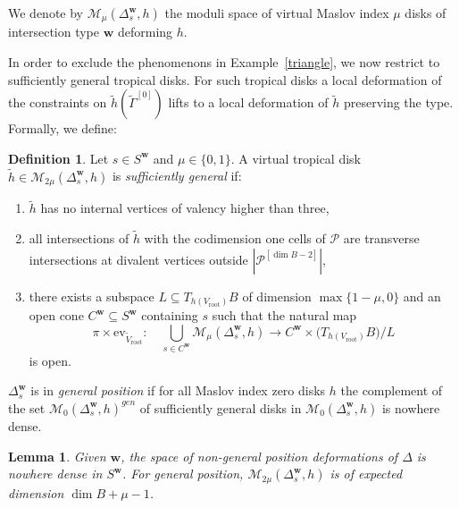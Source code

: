 \documentclass[11pt,letter]{amsart}
\newtheorem{lemma}[theorem]{Lemma}
\theoremstyle{definition}
\newtheorem{definition}[theorem]{Definition}
\theoremstyle{remark}
\numberwithin{equation}{section}
\numberwithin{figure}{section}
\newcommand{\Cover}{\Delta^{\mathbf w}_{s} }
\newcommand{\defbase}{S^{\mathbf w}}
\newcommand{\defcone}{C^{\mathbf w}}
\newcommand {\lra}  {\longrightarrow}
\newcommand {\M} {\mathcal{M}}
\renewcommand {\max} {{\operatorname{max}}}
\renewcommand{\P}  {\mathscr{P}}
\newcommand {\rootvertex}  {V_{\mathrm{root}}}
\begin{document}
We denote by $\M_{\mu}(\Cover,h)$ the moduli space of virtual Maslov index $\mu$
disks of intersection type $\mathbf w$ deforming $h$.

In order to exclude the phenomenons in Example~\ref{triangle}, we now restrict
to sufficiently general tropical disks. For such tropical disks a local
deformation of the constraints on $\tilde h(\tilde \Gamma^{[0]})$ lifts to a
local deformation of $\tilde h$ preserving the type. Formally, we define:

\begin{definition}
Let $ s\in \defbase$ and $\mu \in\{0,1\}$. A virtual tropical disk $\tilde h \in
\M_{2\mu}(\Cover,h)$ is \emph{sufficiently general} if:
\begin{enumerate}
\item
$\tilde h$ has no internal vertices of valency higher than three,
\item
all intersections of $\tilde h$ with the codimension one cells of $\P$ are
transverse intersections at divalent vertices outside $|\P^{[\dim B-2]}|$,
\item 
there exists a subspace $L\subseteq T_{h(\rootvertex)}B$ of dimension
$\max\{1-\mu,0\}$ and an open cone $\defcone \subseteq \defbase$ containing $s$
such that the natural map 
\begin{equation}
\label{eq:constraintmap}
\pi \times \mathrm{ev}_{\widetilde \rootvertex}: \quad 
\bigcup_{s\in \defcone}\M_\mu(\Cover,h) \lra \defcone \times
\big(T_{h(\rootvertex)}B\big)/ L
\end{equation}
is open.
\end{enumerate}
$\Cover$ is in \emph{general position} if for all Maslov index zero disks $h$
the complement of the set $\M_0(\Cover,h)^{gen}$ of sufficiently general disks
in $\M_0(\Cover, h)$ is nowhere dense.
\end{definition}

\begin{lemma} \label{dimModuli}
Given $\mathbf w$, the space of non-general position deformations of $\Delta$ is
nowhere dense in $S^{\mathbf w}$. For general position, $\M_{2\mu}(\Cover,h)$ is
of expected dimension $\dim B+\mu-1$.
\end{lemma}
\end{document}

